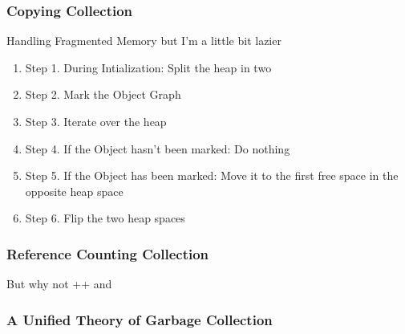 \documentclass{beamer}
\begin{document}
\begin{frame}
  \frametitle{Copying Collection}
  \item Handling Fragmented Memory but I'm a little bit lazier
  \begin{enumerate}
    \item Step 1. During Intialization: Split the heap in two
    \item Step 2. Mark the Object Graph
    \item Step 3. Iterate over the heap
    \item Step 4. If the Object hasn't been marked: Do nothing
    \item Step 5. If the Object has    been marked: Move it to the first free space in the opposite heap space
    \item Step 6. Flip the two heap spaces
  \end{enumerate}
\end{frame}

\begin{frame}
  \frametitle{Reference Counting Collection}
  \item But why not ++ and \-\-
\end{frame}

\begin{frame}
  \frametitle{A Unified Theory of Garbage Collection}
\end{frame}
\end{document}
